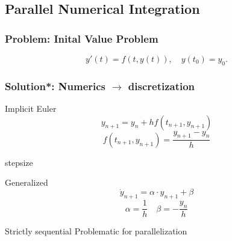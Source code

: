 \subsection{Parallel Numerical Integration}
\begin{frame}
\frametitle{Problem: Inital Value Problem}
\begin{equation*}
y'(t) = f(t,y(t)), \quad y(t_0) = y_0.
\end{equation*}
\end{frame}

\begin{frame}
\frametitle{Solution*: Numerics \(\rightarrow\) discretization}
\begin{exampleblock}{Implicit Euler}
\begin{equation*}
y_{n+1} = y_n + hf(t_{n+1},y_{n+1})
\end{equation*}
\begin{equation*}
    f(t_{n+1},y_{n+1}) = \frac{y_{n+1} - y_n}{h}
    \end{equation*}
\begin{description}[]
    \item[\(h\)] stepsize
\end{description}
\pause
\begin{block}{Generalized}
    \begin{equation*}
        \dot{y}_{n+1} = \alpha \cdot y_{n+1} + \beta
    \end{equation*}
    \begin{equation*}
        \alpha = \frac{1}{h}\quad\beta = - \frac{y_n}{h}
    \end{equation*}
\end{block}
\end{exampleblock}
\pause
\begin{alertblock}{Strictly sequential}
Problematic for parallelization
\end{alertblock}
\end{frame}

